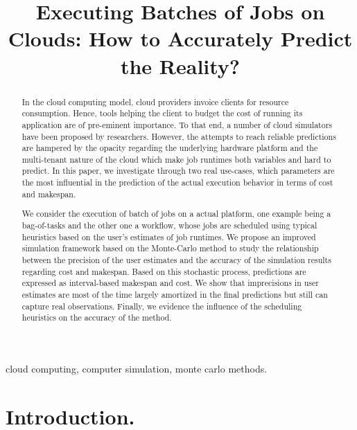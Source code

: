 \documentclass[10pt,conference,compsocconf]{IEEEtran}
\title{Executing Batches of Jobs on Clouds: How to Accurately Predict the Reality?}
\author{\IEEEauthorblockN{Luke~Bertot 
			and Stéphane~Genaud 
			and Julien~Gossa}
	\IEEEauthorblockA{Icube-ICPS --- UMR 7357, Univeristé de Strasbourg, CNRS\\
		P\^ole API Blvd S. Bant, 67400 Illkirch\\
		email: \url{lbertot@unistra.fr}, \url{genaud@unistra.fr}, \url{gossa@unistra.fr}}
	}
\begin{document}
\maketitle

\begin{abstract}
  In the  cloud computing  model, cloud providers  invoice clients  for resource
  consumption. Hence, tools helping the client to budget the cost of running its
  application are  of pre-eminent  importance. To  that end,  a number  of cloud
  simulators have been  proposed by researchers. However, the  attempts to reach
  reliable  predictions are  hampered by  the opacity  regarding the  underlying
  hardware platform  and the  multi-tenant nature  of the  cloud which  make job
  runtimes both  variables and hard to  predict.  In this paper,  we investigate
  through two real  use-cases, which parameters are the most  influential in the
  prediction of the actual execution behavior in terms of cost and makespan.

  We consider the execution  of batch of jobs on a  actual platform, one example
  being a  bag-of-tasks and the other  one a workflow, whose  jobs are scheduled
  using typical  heuristics based on  the user's  estimates of job  runtimes.  We
  propose an  improved simulation framework  based on the Monte-Carlo  method to
  study the  relationship between the  precision of  the user estimates  and the
  accuracy of the simulation results regarding  cost and makespan. Based on this
  stochastic process,  predictions are expressed as  interval-based makespan and
  cost.   We show  that imprecisions  in  user estimates  are most  of the  time
  largely amortized in the final predictions but still can capture real
  observations. Finally, we evidence the influence of the scheduling heuristics
  on the accuracy of the method.
 
\end{abstract}

\begin{IEEEkeywords}
cloud computing, computer simulation, monte carlo methods.
\end{IEEEkeywords}

\section{Introduction.}

\end{document}
